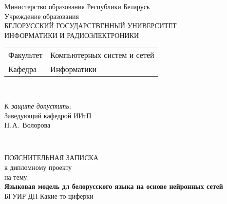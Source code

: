 \begin{titlepage}
  \begin{center}
    Министерство образования Республики Беларусь\\[1em]
    Учреждение образования\\
    БЕЛОРУССКИЙ ГОСУДАРСТВЕННЫЙ УНИВЕРСИТЕТ \\
    ИНФОРМАТИКИ И РАДИОЭЛЕКТРОНИКИ\\[1em]

    \begin{minipage}{\textwidth}
      \begin{flushleft}
        \begin{tabular}{ l l }
          Факультет & Компьютерных систем и сетей\\
          Кафедра   & Информатики
        \end{tabular}
      \end{flushleft}
    \end{minipage}\\[1em]

    \begin{flushright}
      \begin{minipage}{0.4\textwidth}
        \textit{К защите допустить:}\\[0.8em]
        Заведующий кафедрой ИИтП\\[0.45em]
        \underline{\hspace*{2.8cm}} Н.\,А.~Волорова
      \end{minipage}\\[2.2em]
    \end{flushright}

    {ПОЯСНИТЕЛЬНАЯ ЗАПИСКА}\\
    {к дипломному проекту}\\
    {на тему:}\\[1em]
    \textbf{\large Языковая модель дл белорусского языка на основе нейронных сетей}\\[1em]


    {БГУИР ДП Какие-то циферки}\\[2em]
    

\end{center}
\end{titlepage}

